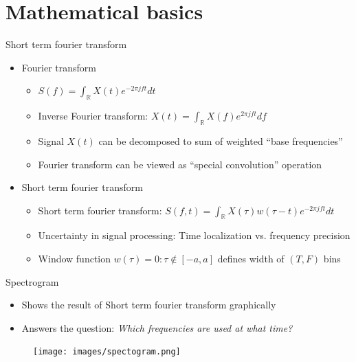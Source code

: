 \documentclass[xcolor=table,mathserif,9pt]{beamer}    %
\begin{document}
\section{Mathematical basics}%
\label{sec:mathematical_basics}
\begin{frame}{Short term fourier transform}

\begin{itemize}
	\setlength\itemsep{1em}
	\item Fourier transform 
	\begin{itemize}
		\item $S(f) = \int_{\mathbb{R}}X(t)e^{-2{\pi}jft}dt$
		\item Inverse Fourier transform: $X(t) = \int_{\mathbb{R}}X(f)e^{2{\pi}jft}df$
		\item Signal $X(t)$ can be decomposed to sum of weighted ``base frequencies''
		\item Fourier transform can be viewed as ``special convolution'' operation
	\end{itemize}
	\item Short term fourier transform
	\begin{itemize}
		\item Short term fourier transform: $S(f,t) = \int_{\mathbb{R}}X(\tau)w(\tau - t)e^{-2{\pi}jft}dt$ 
		\item Uncertainty in signal processing: Time localization vs. frequency precision
		\item Window function $w(\tau) = 0: \tau \not \in \left[-a, a \right]$ defines width of $(T,F)$ bins 
	\end{itemize}
\end{itemize}


\end{frame}

\begin{frame}{Spectrogram}

\begin{itemize}
	\item Shows the result of Short term fourier transform graphically
	\item Answers the question: \emph{Which frequencies are used at what time?}
\end{itemize}

\begin{center}
	\begin{figure}
		\texttt{[image: images/spectogram.png]}
	\end{figure}
\end{center}

\end{frame}
\end{document}
